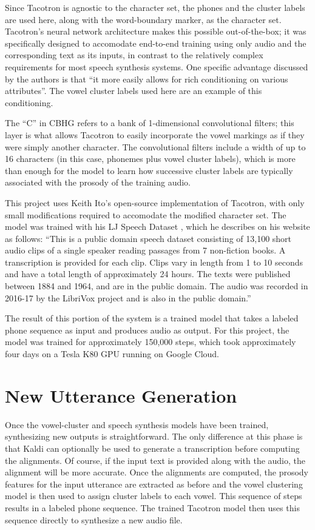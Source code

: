 \documentclass{article}
\begin{document}
Since Tacotron is agnostic to the character set, the phones and the cluster labels are used here, along with the word-boundary marker, as the character set. Tacotron's neural network architecture makes this possible out-of-the-box; it was specifically designed to accomodate end-to-end training using only audio and the corresponding text as its inputs, in contrast to the relatively complex requirements for most speech synthesis systems.
One specific advantage discussed by the authors is that ``it more easily
allows for rich conditioning on various attributes''. The vowel cluster labels used here are an example of this conditioning.

The ``C'' in CBHG refers to a bank of 1-dimensional convolutional filters; this layer is what allows Tacotron to easily incorporate the vowel markings as if they were simply another character. The convolutional filters include a width of up to 16 characters (in this case, phonemes plus vowel cluster labels), which is more than enough for the model to learn how successive cluster labels are typically associated with the prosody of the training audio.

This project uses Keith Ito's open-source implementation of Tacotron, with only small modifications required to accomodate the modified character set. The model was trained with his LJ Speech Dataset \cite{ljspeech17}, which he describes on his website as follows:
``This is a public domain speech dataset consisting of 13,100 short audio clips of a single speaker reading passages from 7 non-fiction books. A transcription is provided for each clip. Clips vary in length from 1 to 10 seconds and have a total length of approximately 24 hours. The texts were published between 1884 and 1964, and are in the public domain. The audio was recorded in 2016-17 by the LibriVox project and is also in the public domain.''

The result of this portion of the system is a trained model that takes a labeled phone sequence as input and produces audio as output. For this project, the model was trained for approximately 150,000 steps, which took approximately four days on a Tesla K80 GPU running on Google Cloud.

\section{New Utterance Generation}
\label{sec:newuttgen}
Once the vowel-cluster and speech synthesis models have been trained, synthesizing new outputs is straightforward.
The only difference at this phase is that Kaldi can optionally be used to generate a transcription before computing the alignments.
Of course, if the input text is provided along with the audio, the alignment will be more accurate.
Once the alignments are computed, the prosody features for the input utterance are extracted as before and the vowel clustering model is then used to assign cluster labels to each vowel.
This sequence of steps results in a labeled phone sequence.
The trained Tacotron model then uses this sequence directly to synthesize a new audio file.
\end{document}

